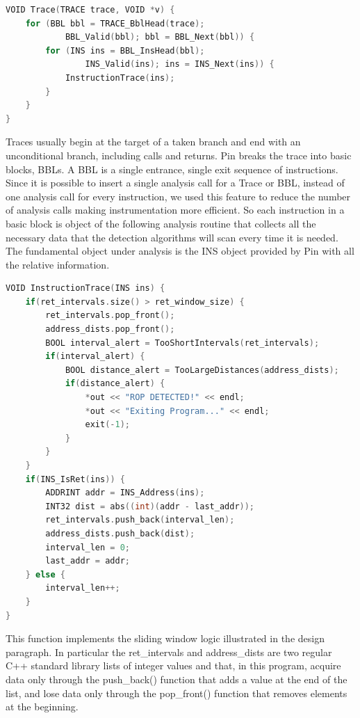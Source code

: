 \documentclass[Lau,binding=0.6cm]{sapthesis}
\begin{document}
\begin{lstlisting}[language=C++]
VOID Trace(TRACE trace, VOID *v) {
	for (BBL bbl = TRACE_BblHead(trace);
			BBL_Valid(bbl); bbl = BBL_Next(bbl)) {
		for (INS ins = BBL_InsHead(bbl); 
				INS_Valid(ins); ins = INS_Next(ins)) {
			InstructionTrace(ins);
		}
	}
}
\end{lstlisting}

Traces usually begin at the target of a taken branch and end with an unconditional branch, including calls and returns.  Pin breaks the trace into basic blocks, BBLs. A BBL is a single entrance, single exit sequence of instructions.
Since it is possible to insert a single analysis call for a Trace or BBL, instead of one analysis call for every instruction, we used this feature to reduce the number of analysis calls making instrumentation more efficient.
So each instruction in a basic block is object of the following analysis routine that collects all the necessary data that the detection algorithms will scan every time it is needed. The fundamental object under analysis is the INS object provided by Pin with all the relative information.

\begin{lstlisting}[language=C++]
VOID InstructionTrace(INS ins) {
	if(ret_intervals.size() > ret_window_size) {
		ret_intervals.pop_front();
		address_dists.pop_front();
		BOOL interval_alert = TooShortIntervals(ret_intervals);
		if(interval_alert) {
			BOOL distance_alert = TooLargeDistances(address_dists);
			if(distance_alert) {
				*out << "ROP DETECTED!" << endl;
				*out << "Exiting Program..." << endl;
				exit(-1);
			}
		}
	}
	if(INS_IsRet(ins)) {
		ADDRINT addr = INS_Address(ins);
		INT32 dist = abs((int)(addr - last_addr));
		ret_intervals.push_back(interval_len);
		address_dists.push_back(dist);
		interval_len = 0;
		last_addr = addr;
	} else {
		interval_len++;
	}
}
\end{lstlisting}

This function implements the sliding window logic illustrated in the design paragraph. In particular the ret\_intervals and address\_dists are two regular C++ standard library lists of integer values and that, in this program, acquire data only through the push\_back() function that adds a value at the end of the list, and lose data only through the pop\_front() function that removes elements at the beginning.
\end{document}
